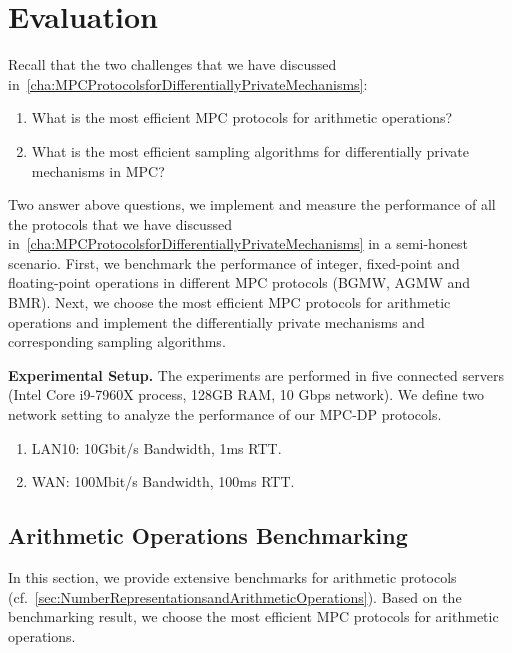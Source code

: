 \chapter{Evaluation}
\label{cha:evaluation}

Recall that the two challenges that we have discussed in~\autoref{cha:MPCProtocolsforDifferentiallyPrivateMechanisms}:
\begin{enumerate}
    \item What is the most efficient MPC protocols for arithmetic operations?
    \item What is the most efficient sampling algorithms for differentially private mechanisms in MPC?
\end{enumerate}

Two answer above questions, we implement and measure the performance of all the protocols that we have discussed in~\autoref{cha:MPCProtocolsforDifferentiallyPrivateMechanisms} in a semi-honest scenario.
First, we benchmark the performance of integer, fixed-point and floating-point operations in different MPC protocols (BGMW, AGMW and BMR).
Next, we choose the most efficient MPC protocols for arithmetic operations and implement the differentially private mechanisms and corresponding sampling algorithms.



\textbf{Experimental Setup.}
The experiments are performed in five connected servers (Intel Core i9-7960X process, 128GB RAM, 10 Gbps network). We define two network setting to analyze the performance of our MPC-DP protocols.
\begin{enumerate}
    \item LAN10: 10Gbit/s Bandwidth, 1ms RTT.
    \item WAN: 100Mbit/s Bandwidth, 100ms RTT.
\end{enumerate}

\section{Arithmetic Operations Benchmarking}
\label{sec:}
In this section, we provide extensive benchmarks for arithmetic protocols (cf.~\autoref{sec:NumberRepresentationsandArithmeticOperations}).
Based on the benchmarking result, we choose the most efficient MPC protocols for arithmetic operations.


